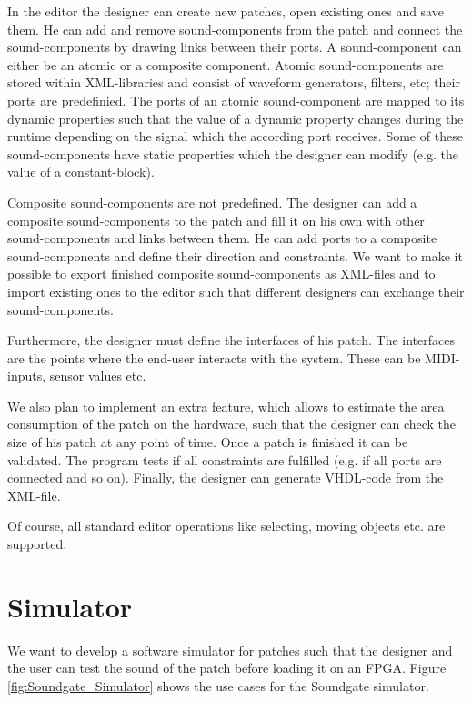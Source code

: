 In the editor the designer can create new patches, open existing ones and save them.
He can add and remove sound-components from the patch and connect the sound-components by drawing links between their ports.
A sound-component can either be an atomic or a composite component. 
Atomic sound-components are stored within XML-libraries and consist of waveform generators, filters, etc; their ports are predefinied. 
The ports of an atomic sound-component are mapped to its dynamic properties such that the value of a dynamic property changes during the runtime depending on the signal which the according port receives.  
Some of these sound-components have static properties which the designer can modify (e.g. the value of a constant-block). 

Composite sound-components are not predefined. 
The designer can add a composite sound-components to the patch and fill it on his own with other sound-components and links between them. 
He can add ports to a composite sound-components and define their direction and constraints. 
We want to make it possible to export finished composite sound-components as XML-files and to import existing ones to the editor such that different designers can exchange their sound-components.


Furthermore, the designer must define the interfaces of his patch. 
The interfaces are the points where the end-user interacts with the system. 
These can be MIDI-inputs, sensor values etc.

We also plan to implement an extra feature, which allows to estimate the area consumption of the patch on the hardware, such that the designer can check the size of his patch at any point of time. 
Once a patch is finished it can be validated. The program tests if all constraints are fulfilled (e.g. if all ports are connected and so on). Finally, the designer can generate VHDL-code from the XML-file.

Of course, all standard editor operations like selecting, moving objects etc. are supported.

\section{Simulator}

We want to develop a software simulator for patches such that the designer and the user can test the sound of the patch before loading it on an \ac{FPGA}. Figure \ref{fig:Soundgate_Simulator} shows the use cases for the Soundgate simulator.


